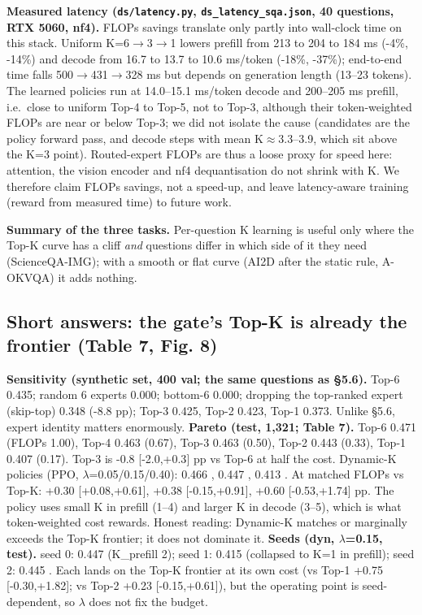 \textbf{Measured latency (\texttt{ds/latency.py}, \texttt{ds\_latency\_sqa.json}, 40 questions, RTX 5060, nf4).} FLOPs savings translate only partly into wall-clock time on this stack. Uniform K=6$\rightarrow$3$\rightarrow$1 lowers prefill from 213 to 204 to 184 ms (-4\%, -14\%) and decode from 16.7 to 13.7 to 10.6 ms/token (-18\%, -37\%); end-to-end time falls 500$\rightarrow$431$\rightarrow$328 ms but depends on generation length (13--23 tokens). The learned policies run at 14.0--15.1 ms/token decode and 200--205 ms prefill, i.e.~close to uniform Top-4 to Top-5, not to Top-3, although their token-weighted FLOPs are near or below Top-3; we did not isolate the cause (candidates are the policy forward pass, and decode steps with mean K$\approx$3.3--3.9, which sit above the K=3 point). Routed-expert FLOPs are thus a loose proxy for speed here: attention, the vision encoder and nf4 dequantisation do not shrink with K. We therefore claim FLOPs savings, not a speed-up, and leave latency-aware training (reward from measured time) to future work.

\textbf{Summary of the three tasks.} Per-question K learning is useful only where the Top-K curve has a cliff \emph{and} questions differ in which side of it they need (ScienceQA-IMG); with a smooth or flat curve (AI2D after the static rule, A-OKVQA) it adds nothing.

\subsection{Short answers: the gate's Top-K is already the frontier (Table 7, Fig. 8)}\label{short-answers-the-gates-top-k-is-already-the-frontier-table-7-fig.-8}

\textbf{Sensitivity (synthetic set, 400 val; the same questions as §5.6).} Top-6 0.435; random 6 experts 0.000; bottom-6 0.000; dropping the top-ranked expert (skip-top) 0.348 (-8.8 pp); Top-3 0.425, Top-2 0.423, Top-1 0.373. Unlike §5.6, expert identity matters enormously.
\textbf{Pareto (test, 1,321; Table 7).} Top-6 0.471 (FLOPs 1.00), Top-4 0.463 (0.67), Top-3 0.463 (0.50), Top-2 0.443 (0.33), Top-1 0.407 (0.17). Top-3 is -0.8 {[}-2.0,+0.3{]} pp vs Top-6 at half the cost.
Dynamic-K policies (PPO, $\lambda$=0.05/0.15/0.40): 0.466 \citet{0.667}, 0.447 \citet{0.335}, 0.413 \citet{0.168}. At matched FLOPs vs Top-K: +0.30 {[}+0.08,+0.61{]}, +0.38 {[}-0.15,+0.91{]}, +0.60 {[}-0.53,+1.74{]} pp.
The policy uses small K in prefill (1--4) and larger K in decode (3--5), which is what token-weighted cost rewards. Honest reading: Dynamic-K matches or marginally exceeds the Top-K frontier; it does not dominate it.
\textbf{Seeds (dyn, $\lambda$=0.15, test).} seed 0: 0.447 \citet{0.335} (K\_prefill 2); seed 1: 0.415 \citet{0.169} (collapsed to K=1 in prefill); seed 2: 0.445 \citet{0.335}. Each lands on the Top-K frontier at its own cost (vs Top-1 +0.75 {[}-0.30,+1.82{]}; vs Top-2 +0.23 {[}-0.15,+0.61{]}), but the operating point is seed-dependent, so $\lambda$ does not fix the budget.

